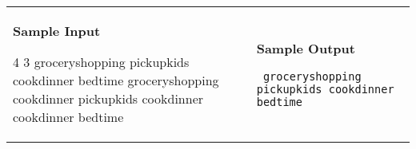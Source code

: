 \documentclass[11pt]{article}
\begin{document}
\vspace{0.25in}\hspace{-0.3in}\begin{tabular}{ll}

\parbox{3in}{{\large\bf Sample Input}

\vspace{0.15in}

{\tt 

4 3\linebreak
groceryshopping\linebreak
pickupkids\linebreak
cookdinner\linebreak
bedtime\linebreak
groceryshopping cookdinner\linebreak
pickupkids cookdinner\linebreak
cookdinner bedtime
}
}

&

\parbox{3in}{{\large\bf Sample Output}

\vspace{0.15in}

{\tt
groceryshopping pickupkids cookdinner bedtime
}
}

\\
\end{tabular}
\end{document}
